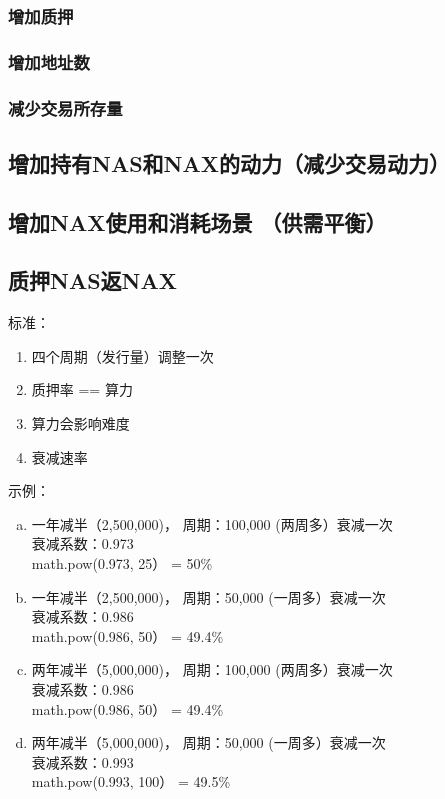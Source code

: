 \subsubsection{增加质押} 
\subsubsection{增加地址数} 
\subsubsection{减少交易所存量} 
\subsection{增加持有NAS和NAX的动力（减少交易动力）} 
\subsection{增加NAX使用和消耗场景 （供需平衡）} 

\subsection{质押NAS返NAX}
标准：
\begin{enumerate}
\item 四个周期（发行量）调整一次
\item 质押率 == 算力
\item 算力会影响难度
\item 衰减速率
\end{enumerate}

示例：
\begin{enumerate}[a.]

\item 一年减半（2,500,000)， 周期：100,000 (两周多）衰减一次\\
衰减系数：0.973\\
math.pow(0.973, 25） = 50\%

\item 一年减半（2,500,000)， 周期：50,000 (一周多）衰减一次\\
衰减系数：0.986\\
math.pow(0.986, 50） = 49.4\%

\item 两年减半（5,000,000)， 周期：100,000 (两周多）衰减一次\\
衰减系数：0.986\\
math.pow(0.986, 50） = 49.4\%

\item 两年减半（5,000,000)， 周期：50,000 (一周多）衰减一次\\
衰减系数：0.993\\
math.pow(0.993, 100） = 49.5\%

\end{enumerate}

